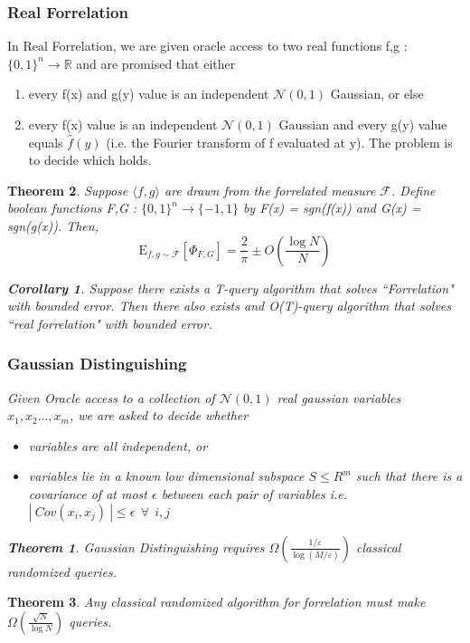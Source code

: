 \documentclass{article}
\newtheorem{theorem}{Theorem}
\newtheorem{corollary}{Corollary}[theorem]
\begin{document}
\subsubsection{Real Forrelation}
In Real Forrelation, we are given oracle access to two real functions f,g : $\{0,1\}^{n}\rightarrow \mathbb{R}$ and are promised that either
\begin{enumerate}
\item every f(x) and g(y) value is an independent $\mathcal{N}(0,1)$ Gaussian, or else
\item every f(x) value is an independent $\mathcal{N}(0,1)$ Gaussian and every g(y) value equals $\hat{f}(y)$ (i.e. the Fourier transform of f evaluated at y).
The problem is to decide which holds.
\end{enumerate}
\begin{theorem}
Suppose $\langle f, g\rangle$ are drawn from the forrelated measure $\mathcal{F}$. Define boolean functions F,G : $\{0,1\}^{n} \rightarrow \{-1,1\}$ by F(x) = sgn(f(x)) and G(x) = sgn(g(x)). Then,
\begin{equation}
\mathrm{E}_{f, g \sim \mathcal{F}}\left[\Phi_{F, G}\right]=\frac{2}{\pi} \pm O\left(\frac{\log N}{N}\right)
\end{equation}

\begin{corollary}
Suppose there exists a T-query algorithm that solves ``Forrelation" with bounded error. Then there also exists and O(T)-query algorithm that solves ``real forrelation" with bounded error.
\end{corollary}

\subsubsection{Gaussian Distinguishing}
Given Oracle access to a collection of $\mathcal{N}(0,1)$ real gaussian variables $x_{1},x_{2}..., x_{m}$, we are asked to decide whether 
\begin{itemize}
\item variables are all independent, or
\item variables lie in a known low dimensional subspace $S \leq R^{m}$ such that there is a covariance of at most $\epsilon$ between each pair of variables i.e.  $ |~Cov(x_{i},x_{j})~| \leq \epsilon~~ \forall~~ i,j$
\end{itemize}

\begin{theorem}
Gaussian Distinguishing requires $\Omega\left(\frac{1 / \varepsilon}{\log (M / \varepsilon)}\right)$ classical randomized queries.
\end{theorem}



\end{theorem}
\begin{theorem}
Any classical randomized algorithm for forrelation must make  $\Omega\left(\frac{\sqrt{N}}{\log N}\right)$ queries.
\end{theorem}
\end{document}
